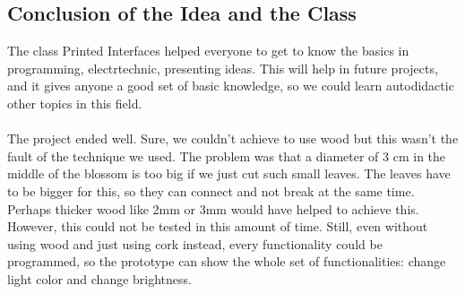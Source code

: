 \documentclass[00_doc.tex]{subfiles}
\begin{document}
    \subsection{Conclusion of the Idea and the Class}
    \begin{flushleft}
        The class Printed Interfaces helped everyone to get to know the basics in programming,
        electrtechnic, presenting ideas. This will help in future projects, and it gives anyone 
        a good set of basic knowledge, so we could learn autodidactic other topics in this field.\\~\\

        The project ended well. Sure, we couldn't achieve to use wood but this wasn't the fault of 
        the technique we used. The problem was that a diameter of 3 cm in the middle of the blossom 
        is too big if we just cut such small leaves. The leaves have to be bigger for this, so 
        they can connect and not break at the same time. Perhaps thicker wood like 2mm or 3mm would 
        have helped to achieve this. However, this could not be tested in this amount of time.
        Still, even without using wood and just using cork instead, every functionality could be 
        programmed, so the prototype can show the whole set of functionalities: change light color 
        and change brightness.
    \end{flushleft}
\end{document}
